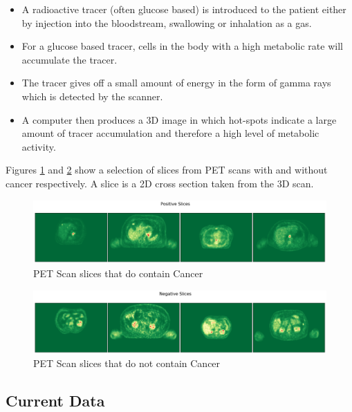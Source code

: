 \begin{itemize}
    \item A radioactive tracer (often glucose based) is introduced to the patient either by injection into the bloodstream, swallowing or inhalation as a gas.
    \item For a glucose based tracer, cells in the body with a high metabolic rate will accumulate the tracer.
    \item The tracer gives off a small amount of energy in the form of gamma rays which is detected by the scanner.
    \item A computer then produces a 3D image in which hot-spots indicate a large amount of tracer accumulation and therefore a high level of metabolic activity.
\end{itemize}

Figures \ref{fig:positive} and \ref{fig:negative} show a selection of slices from PET scans with and without cancer respectively.
A slice is a 2D cross section taken from the 3D scan.

\begin{figure}[hbtp!]
    \centering
    \includegraphics[width=\textwidth]{./img/positive.png}
    \caption{PET Scan slices that do contain Cancer}
    \label{fig:positive}
\end{figure}

\begin{figure}[hbtp!]
    \centering
    \includegraphics[width=\textwidth]{./img/negative.png}
    \caption{PET Scan slices that do not contain Cancer}
    \label{fig:negative}
\end{figure}


\subsection{Current Data}\label{subsec:current_data_intro}

